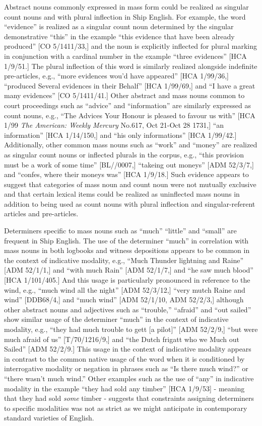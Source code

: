 Abstract nouns commonly expressed in mass form could be realized as singular count nouns and with plural inflection in Ship English. For example, the word “evidence” is realized as a singular count noun determined by the singular demonstrative “this” in the example “this evidence that have been already produced” [CO 5/1411/33,] and the noun is explicitly inflected for plural marking in conjunction with a cardinal number in the example “three evidences” [HCA 1/9/51.] The plural inflection of this word is similarly realized alongside indefinite pre-articles, e.g., “more evidences wou’d have appeared” [HCA 1/99/36,] “produced Several evidences in their Behalf” [HCA 1/99/69,] and “I have a great many evidences” [CO 5/1411/41.] Other abstract and mass nouns common to court proceedings such as “advice” and “information” are similarly expressed as count nouns, e.g., “The Advices Your Honour is pleased to favour us with” [HCA 1/99 \textit{The American: Weekly Mercury} No.617, Oct 21-Oct 28 1731,] “an information” [HCA 1/14/150,] and “his only informations” [HCA 1/99/42.] Additionally, other common mass nouns such as “work” and “money” are realized as singular count nouns or inflected plurals in the corpus, e.g., “this provision must be a work of some time” [BL/\citealt{Egerton2395}/0007,] “takeing out moneys” [ADM 52/3/7,] and “confes, where their moneys was” [HCA 1/9/18.] Such evidence appears to suggest that categories of mass noun and count noun were not mutually exclusive and that certain lexical items could be realized as uninflected mass nouns in addition to being used as count nouns with plural inflection and singular-referent articles and pre-articles. 

Determiners specific to mass nouns such as “much” “little” and “small” are frequent in Ship English. The use of the determiner “much” in correlation with mass nouns in both logbooks and witness depositions appears to be common in the context of indicative modality, e.g., “Much Thunder lightning and Raine” [ADM 52/1/1,] and “with much Rain” [ADM 52/1/7,] and “he saw much blood” [HCA 1/101/405.] And this usage is particularly pronounced in reference to the wind, e.g., “much wind all the night” [ADM 52/3/12,] “very mutch Raine and wind” [DDB68/4,] and “much wind” [ADM 52/1/10, ADM 52/2/3,] although other abstract nouns and adjectives such as “trouble,” “afraid” and “out sailed” show similar usage of the determiner “much” in the context of indicative modality, e.g., “they had much trouble to gett [a pilot]” [ADM 52/2/9,] “but were much afraid of us” [T/70/1216/9,] and “the Dutch frigatt who we Much out Sailed” [ADM 52/2/9.] This usage in the context of indicative modality appears in contrast to the common native usage of the word when it is conditioned by interrogative modality or negation in phrases such as “Is there much wind?” or “there wasn’t much wind.” Other examples such as the use of “any” in indicative modality in the example “they had sold any timber” [HCA 1/9/53] - meaning that they had sold \textit{some} timber - suggests that constraints assigning determiners to specific modalities was not as strict as we might anticipate in contemporary standard varieties of English.  

